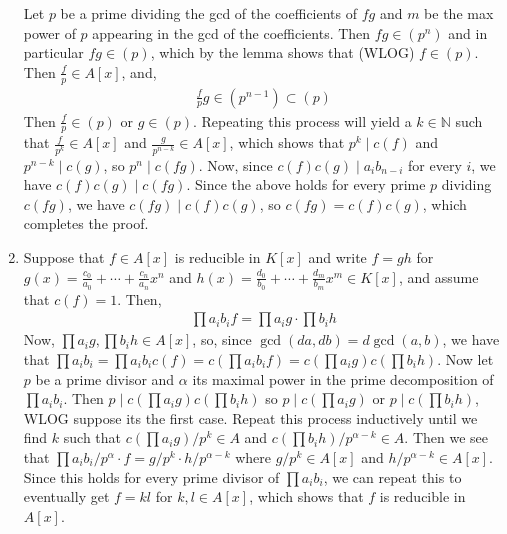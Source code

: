 \documentclass[12pt]{article}
\theoremstyle{definitionstyle}
\def\mbb#1{\mathbb{#1}}
\def\bN{\mbb{N}}
\begin{document}
\begin{enumerate}[leftmargin=\labelsep]
		Let $p$ be a prime dividing the gcd of the coefficients of $fg$ and $m$ be the max power of $p$ appearing in the gcd of the coefficients. Then $fg \in (p^n)$ and in particular $fg \in (p)$, which by the lemma shows that (WLOG) $f \in (p)$. Then $\frac fp \in A[x]$, and,
		\begin{align*}
			\frac{f}{p} g \in (p^{n-1}) \subset (p)
		\end{align*}
		Then $\frac fp \in (p)$ or $g \in (p)$. Repeating this process will yield a $k \in \bN$ such that $\frac{f}{p^k} \in A[x]$ and $\frac{g}{p^{n-k}} \in A[x]$, which shows that $p^k \mid c(f)$ and $p^{n-k} \mid c(g)$, so $p^n \mid c(fg)$. Now, since $c(f)c(g) \mid a_ib_{n-i}$ for every $i$, we have $c(f)c(g) \mid c(fg)$. Since the above holds for every prime $p$ dividing $c(fg)$, we have $c(fg) \mid c(f)c(g)$, so $c(fg) = c(f)c(g)$, which completes the proof.
		
		\item Suppose that $f \in A[x]$ is reducible in $K[x]$ and write $f = gh$ for $g(x) = \frac{c_0}{a_0} + \cdots + \frac{c_n}{a_n}x^n$ and $h(x) = \frac{d_0}{b_0} + \cdots + \frac{d_m}{b_m}x^m \in K[x]$, and assume that $c(f) = 1$. Then,
		\begin{align*}
			\prod a_ib_i f = \prod a_i g \cdot \prod b_i h
		\end{align*}
		Now, $\prod a_i g, \prod b_i h \in A[x]$, so, since $\gcd(da, db) = d\gcd(a, b)$, we have that $\prod a_ib_i = \prod a_ib_i c(f) = c(\prod a_i b_i f) = c(\prod a_i g) c(\prod b_i h)$. Now let $p$ be a prime divisor and $\alpha$ its maximal power in the prime decomposition of $\prod a_ib_i$. Then $p \mid c(\prod a_i g) c(\prod b_i h)$ so $p \mid c(\prod a_i g)$ or $p \mid c(\prod b_i h)$, WLOG suppose its the first case. Repeat this process inductively until we find $k$ such that $c(\prod a_i g)/p^k \in A$ and $c(\prod b_i h)/p^{\alpha-k} \in A$. Then we see that $\prod a_ib_i / p^\alpha \cdot f = g/p^k \cdot h/p^{\alpha-k}$ where $g/p^k \in A[x]$ and $h/p^{\alpha-k} \in A[x]$. Since this holds for every prime divisor of $\prod a_ib_i$, we can repeat this to eventually get $f = kl$ for $k, l \in A[x]$, which shows that $f$ is reducible in $A[x]$.
		

\end{enumerate}
\end{document}
